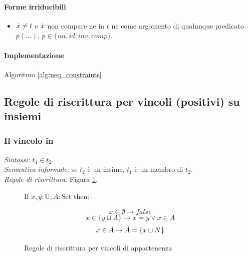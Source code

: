 \documentclass[12pt,a4paper,openright]{book}  %
\begin{document}
\paragraph{Forme irriducibili}
\begin{itemize}
	\item $\dot{x} \neq t$ e $\dot{x}$ non compare ne in $t$ ne come
          argomento di qualunque predicato $p(\ldots)$, $p \in \{ un,
          id, inv, comp \}$.
\end{itemize}

\paragraph{Implementazione}
Algoritmo \ref{alg:neq_constraints}

\subsection{Regole di riscrittura per vincoli (positivi) su insiemi}
\label{subsec:clpbasedlang_lset_rewriteset}

\subsubsection{Il vincolo in}

\textit{Sintassi:} $t_1 \in t_2$.\\
\noindent\textit{Semantica informale:} se $t_2$ è un insime, $t_1$ è un membro di $t_2$.\\
\noindent\textit{Regole di riscrittura:} Figura \ref{fig:in_constraints}.

\begin{figure}
	\begin{tcolorbox}[colframe=black, colback=white, sharp corners]
		\setcounter{equation}{0}
		\renewcommand{\theequation}{$\in$\textsubscript{\arabic{equation}}}

		If $x, y: \text{U}; A: \text{Set}$ then:

		\begin{equation}
		x \in \emptyset \to false
		\end{equation}
		\begin{equation}
		x \in \{ y \sqcup A \} \to x = y \lor x \in A
		\end{equation}
		\begin{equation}
		x \in \dot{A} \to \dot{A} = \{ x \sqcup N \}
		\end{equation}

	\end{tcolorbox}

	\caption{Regole di riscrittura per vincoli di appartenenza}
	\label{fig:in_constraints}
\end{figure}
\end{document}
